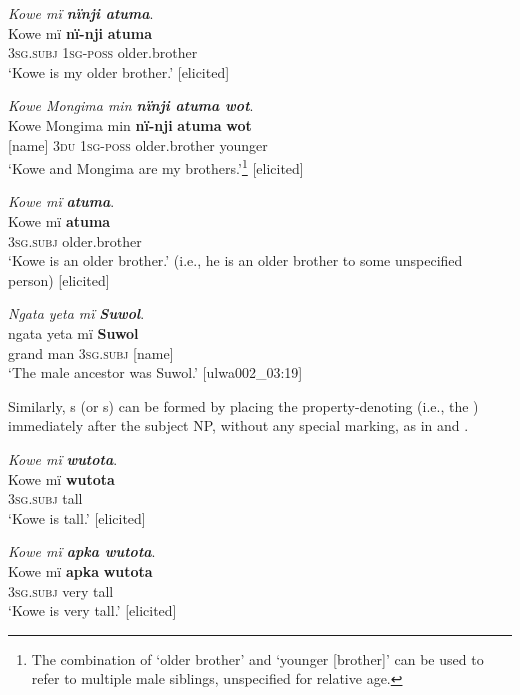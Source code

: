 \ea%
    \label{ex:pred:24}
          \textit{Kowe mï \textbf{nïnji atuma}}.\\
\gll Kowe  mï      \textbf{nï-nji}    \textbf{atuma}\\
    [name]  3\textsc{sg.subj}  \textsc{1sg-poss}  older.brother\\
\glt `Kowe is my older brother.’ [elicited]
\z

\ea%
    \label{ex:pred:25}
          \textit{Kowe Mongima min \textbf{nïnji atuma wot}}.\\
\gll Kowe  Mongima  min  \textbf{nï-nji}    \textbf{atuma}      \textbf{wot}\\
    [name]  [name]    3\textsc{du}  \textsc{1sg-poss}  older.brother  younger\\
\glt `Kowe and Mongima are my brothers.’\footnote{The combination of ‘older brother’ and ‘younger [brother]’ can be used to refer to multiple male siblings, unspecified for relative age.} [elicited]
\z

\ea%
    \label{ex:pred:26}
          \textit{Kowe mï} \textbf{\textit{atuma}}.\\
\gll Kowe  mï      \textbf{atuma}\\
    [name]  3\textsc{sg.subj}  older.brother\\
\glt `Kowe is an older brother.’ (i.e., he is an older brother to some unspecified person) [elicited]
\z

\newpage

\ea%
    \label{ex:pred:27}
          \textit{Ngata yeta mï} \textbf{\textit{Suwol}}.\\
\gll ngata  yeta  mï      \textbf{Suwol}\\
    grand  man  3\textsc{sg.subj}  [name]\\
\glt `The male ancestor was Suwol.’ [ulwa002\_03:19]
\z

  Similarly, s (or s) can be formed by placing the property-denoting  (i.e., the ) immediately after the subject NP, without any special marking, as in  and .

\ea%
    \label{ex:pred:28}
          \textit{Kowe mï} \textbf{\textit{wutota}}.\\
\gll Kowe  mï      \textbf{wutota}\\
    [name]  3\textsc{sg.subj}  tall\\
\glt `Kowe is tall.’ [elicited]
\z

\ea%
    \label{ex:pred:29}
          \textit{Kowe mï \textbf{apka wutota}}.\\
\gll Kowe  mï      \textbf{apka}  \textbf{wutota}\\
    [name]  3\textsc{sg.subj}  very  tall\\
\glt `Kowe is very tall.’ [elicited]
\z

